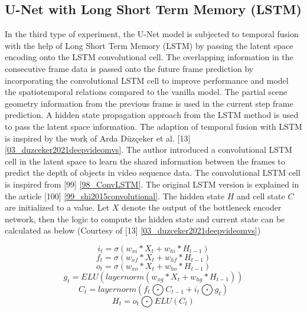     
    \subsection{U-Net with Long Short Term Memory (LSTM)}
    
    In the third type of experiment, the U-Net model is subjected to temporal fusion with the help of Long Short Term Memory (LSTM) by passing the latent space encoding onto the LSTM convolutional cell. The overlapping information in the consecutive frame data is passed onto the future frame prediction by incorporating the convolutional LSTM cell to improve performance and model the spatiotemporal relations compared to the vanilla model. The partial scene geometry information from the previous frame is used in the current step frame prediction. A hidden state propagation approach from the LSTM method is used to pass the latent space information. The adaption of temporal fusion with LSTM is inspired by the work of Arda Düzçeker et al. [13] \ref{03_duzceker2021deepvideomvs}. The author introduced a convolutional LSTM cell in the latent space to learn the shared information between the frames to predict the depth of objects in video sequence data. The convolutional LSTM cell is inspired from [99] \ref{98_ConvLSTM}. The original LSTM version is explained in the article [100] \ref{99_shi2015convolutional}. The hidden state $H$ and cell state $C$ are initialized to a value. Let $X$ denote the output of the bottleneck encoder network, then the logic to compute the hidden state and current state can be calculated as below (Courtesy of [13] \ref{03_duzceker2021deepvideomvs})
    
    \begin{equation}
    	i_t = \sigma(w_{xi}*X_t+w_{hi}*H_{t-1})
    	\label{eq:it}
    \end{equation}
    \begin{equation}
		f_t = \sigma(w_{xf}*X_t+w_{hf}*H_{t-1})
		\label{eq:ft}
	\end{equation}    
    \begin{equation}
	 	o_t = \sigma(w_{xo}*X_t+w_{ho}*H_{t-1})
	 	\label{eq:ot}
 	\end{equation}   
    \begin{equation}
	    g_t = ELU(layernorm(w_{xg}*X_t+w_{hg}*H_{t-1}))
	    \label{eq:gt}
    \end{equation}
    \begin{equation}
	    C_t = layernorm(f_t \bigodot C_{t-1} +i_t \bigodot g_t)
	    \label{eq:Ct}
    \end{equation}
    \begin{equation}
	    H_t = o_t \bigodot ELU(C_t)
	    \label{eq:Ht}
    \end{equation}
    
